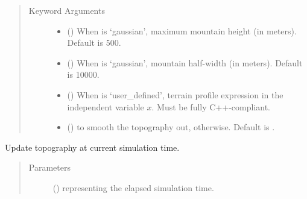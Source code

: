 \documentclass[letterpaper,10pt,english]{sphinxmanual}
\begin{document}
\begin{fulllineitems}
\begin{fulllineitems}
\begin{quote}
\begin{description}
\item[{Keyword Arguments}] \leavevmode\begin{itemize}
\item {} 
 () \textendash{} When  is ‘gaussian’, maximum mountain height (in meters). Default is 500.

\item {} 
 () \textendash{} When  is ‘gaussian’, mountain half-width (in meters). Default is 10000.

\item {} 
 () \textendash{} When  is ‘user\_defined’, terrain profile expression in the independent variable \(x\).
Must be fully C++-compliant.

\item {} 
 () \textendash{}  to smooth the topography out,  otherwise. Default is .

\end{itemize}

\end{description}\end{quote}

\end{fulllineitems}


\begin{fulllineitems}
\label{\detokenize{api:tasmania.grids.topography.Topography1d.update}}
Update topography at current simulation time.
\begin{quote}\begin{description}
\item[{Parameters}] \leavevmode
{} () \textendash{}  representing the elapsed simulation time.

\end{description}\end{quote}

\end{fulllineitems}


\end{fulllineitems}
\end{document}
